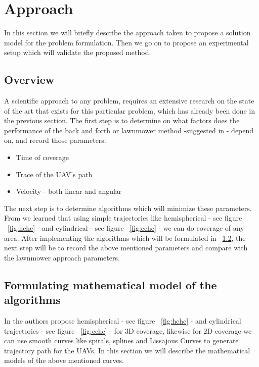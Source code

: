 \section{Approach} 
\label{sec:app}
%
%
%
%
%
In this section we will briefly describe the approach taken to propose a solution model for the problem formulation. Then we go on to propose an experimental setup which will validate the proposed method.

\subsection{Overview}

A scientific approach to any problem, requires an extensive research on the state of the art that exists for this particular problem, which has already been done in the previous section. 
The first step is to determine on what factors does the performance of the back and forth or lawnmower method -suggested in  \cite{1,2,3,8,10}- depend on, and record those parameters:
\begin{itemize}
\item Time of coverage
\item Trace of the UAV's path
\item Velocity - both linear and angular
\end{itemize}
The next step is to determine algorithms which will minimize these parameters. From \cite{6} we learned that using simple trajectories like hemispherical - see figure ~\ref{fig:hchc} - and cylindrical - see figure ~\ref{fig:cchc} - we can do coverage of any area. After implementing the algorithms which will be formulated in ~\ref{subsec:fml343}, the next step will be to record the above mentioned parameters and compare with the lawnmower approach parameters. 

\subsection{Formulating mathematical model of the algorithms}
\label{subsec:fml343}
In \cite{6} the authors propose hemispherical - see figure ~\ref{fig:hchc} - and cylindrical trajectories - see figure ~\ref{fig:cchc} - for 3D coverage, likewise for 2D coverage we can use smooth curves like spirals, splines and Lissajous Curves to generate trajectory path for the UAVs. In this section we will describe the mathematical models of the above mentioned curves.

